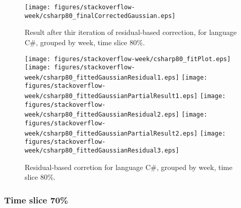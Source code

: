 \begin{figure}[]
\centering
{\texttt{[image: figures/stackoverflow-week/csharp80\_finalCorrectedGaussian.eps]}}
\caption{Result after thir iteration of residual-based correction, for language C\#, grouped by week, time slice 80\%.}
\end{figure}


\begin{figure}[hb]
\centering
{}
{\texttt{[image: figures/stackoverflow-week/csharp80\_fitPlot.eps]}}
{\texttt{[image: figures/stackoverflow-week/csharp80\_fittedGaussianResidual1.eps]}}
{\texttt{[image: figures/stackoverflow-week/csharp80\_fittedGaussianPartialResult1.eps]}}
{\texttt{[image: figures/stackoverflow-week/csharp80\_fittedGaussianResidual2.eps]}}
{\texttt{[image: figures/stackoverflow-week/csharp80\_fittedGaussianPartialResult2.eps]}}
{\texttt{[image: figures/stackoverflow-week/csharp80\_fittedGaussianResidual3.eps]}}
\caption{Residual-based corretion for language C\#, grouped by week, time slice 80\%.}
\end{figure}


\clearpage 
\newpage 


\FloatBarrier

\subsubsection{Time slice 70\%}

